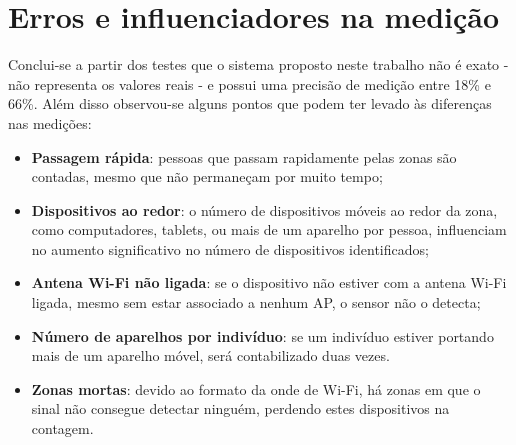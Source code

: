 \section{Erros e influenciadores na medição}
\label{erros-influencia}
Conclui-se a partir dos testes que o sistema proposto neste trabalho não é exato - não
representa os valores reais - e possui uma precisão de medição entre 18\% e
66\%. Além disso observou-se alguns pontos que podem ter levado às diferenças nas medições:
\begin{itemize}
    \item \textbf{Passagem rápida}: pessoas que passam rapidamente pelas zonas são contadas, mesmo que não
    permaneçam por muito tempo;
    \item \textbf{Dispositivos ao redor}: o número de dispositivos móveis ao redor da zona, como computadores, tablets,
    ou mais de um aparelho por pessoa, influenciam no aumento significativo no número de dispositivos identificados;
    \item \textbf{Antena Wi-Fi não ligada}: se o dispositivo não estiver com a antena Wi-Fi ligada, mesmo sem
    estar associado a nenhum AP, o sensor não o detecta;
    \item \textbf{Número de aparelhos por indivíduo}: se um indivíduo estiver portando mais de um aparelho
    móvel, será contabilizado duas vezes.
    \item \textbf{Zonas mortas}: devido ao formato da onde de Wi-Fi, há zonas em que o sinal não consegue
    detectar ninguém, perdendo estes dispositivos na contagem.
\end{itemize}

